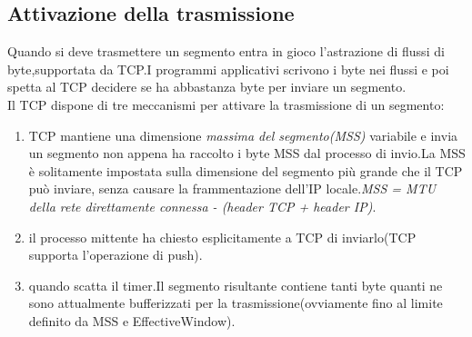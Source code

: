 \subsection{Attivazione della trasmissione}
Quando si deve trasmettere un segmento entra in gioco l'astrazione di flussi di byte,supportata da TCP.I programmi applicativi scrivono i byte nei flussi e poi spetta al TCP decidere se ha abbastanza byte per inviare un segmento. \\
Il TCP dispone di tre meccanismi per attivare la trasmissione di un segmento:
\begin{enumerate}
  \item TCP mantiene una dimensione \textit{massima del segmento(MSS)} variabile e invia un segmento non appena ha raccolto i byte MSS dal processo di invio.La MSS è solitamente impostata sulla dimensione del segmento più grande che il TCP può inviare, senza causare la frammentazione dell'IP locale.\textit{MSS = MTU della rete direttamente connessa - (header TCP + header IP)}.
  \item il processo mittente ha chiesto esplicitamente a TCP di inviarlo(TCP supporta l'operazione di push).
  \item quando scatta il timer.Il segmento risultante contiene tanti byte quanti ne sono attualmente bufferizzati per la trasmissione(ovviamente fino al limite definito da MSS e EffectiveWindow).
\end{enumerate}
